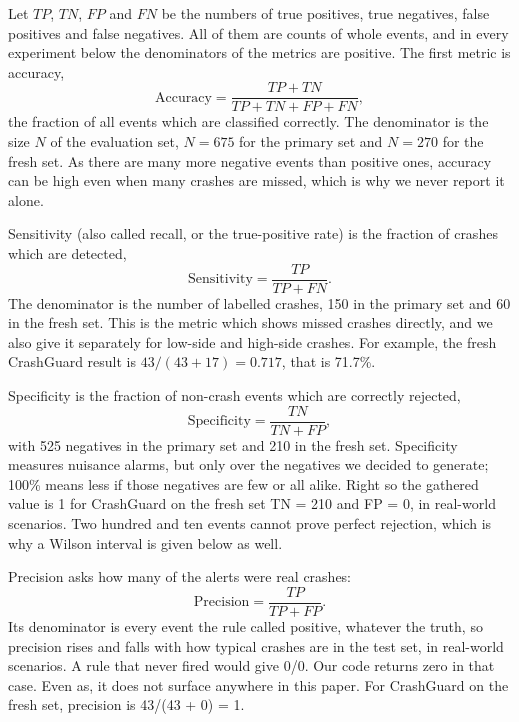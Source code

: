 \documentclass[10pt,a4paper]{article}
\begin{document}
Let $TP$, $TN$, $FP$ and $FN$ be the numbers of true positives, true negatives, false positives and false negatives. All of them are counts of whole events, and in every experiment below the denominators of the metrics are positive. The first metric is accuracy,
\begin{equation}\label{eq:accuracy} \mathrm{Accuracy}=\frac{TP+TN}{TP+TN+FP+FN},\end{equation}
the fraction of all events which are classified correctly. The denominator is the size $N$ of the evaluation set, $N=675$ for the primary set and $N=270$ for the fresh set. As there are many more negative events than positive ones, accuracy can be high even when many crashes are missed, which is why we never report it alone.

Sensitivity (also called recall, or the true-positive rate) is the fraction of crashes which are detected,
\begin{equation}\label{eq:sensitivity} \mathrm{Sensitivity}=\frac{TP}{TP+FN}.\end{equation}
The denominator is the number of labelled crashes, 150 in the primary set and 60 in the fresh set. This is the metric which shows missed crashes directly, and we also give it separately for low-side and high-side crashes. For example, the fresh CrashGuard result is $43/(43+17)=0.717$, that is 71.7\%.

Specificity is the fraction of non-crash events which are correctly rejected,
\begin{equation}\label{eq:specificity} \mathrm{Specificity}=\frac{TN}{TN+FP},\end{equation}
with 525 negatives in the primary set and 210 in the fresh set. Specificity measures nuisance alarms, but only over the negatives we decided to generate; 100\% means less if those negatives are few or all alike. Right so the gathered value is 1 for CrashGuard on the fresh set TN = 210 and FP = 0, in real-world scenarios. Two hundred and ten events cannot prove perfect rejection, which is why a Wilson interval is given below as well.

Precision asks how many of the alerts were real crashes:
\begin{equation}\label{eq:precision} \mathrm{Precision}=\frac{TP}{TP+FP}.\end{equation}
Its denominator is every event the rule called positive, whatever the truth, so precision rises and falls with how typical crashes are in the test set, in real-world scenarios. A rule that never fired would give 0/0. Our code returns zero in that case. Even as, it does not surface anywhere in this paper. For CrashGuard on the fresh set, precision is 43/(43 + 0) = 1.
\end{document}
